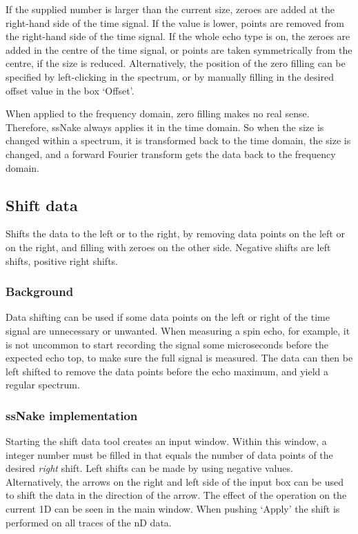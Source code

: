 \documentclass[11pt,a4paper]{article}
\begin{document}
If the supplied number is larger than the current size, zeroes are added at the right-hand side of the time signal. If the value is lower, points are removed from the right-hand side of the time signal. If the whole echo type is on, the zeroes are added in the centre of the time signal, or points are taken symmetrically from the centre, if the size is reduced. Alternatively, the position of the zero filling can be specified by left-clicking in the spectrum, or by manually filling in the desired offset value in the box `Offset'.

When applied to the frequency domain, zero filling makes no real sense. Therefore, ssNake always applies it in the time domain. So when the size is changed within a spectrum, it is transformed back to the time domain, the size is changed, and a forward Fourier transform gets the data back to the frequency domain.

\subsection{Shift data}
Shifts the data to the left or to the right, by removing data points on the left or on the right, and filling with zeroes on the other side. Negative shifts are left shifts, positive right shifts.

\subsubsection*{Background}
Data shifting can be used if some data points on the left or right of the time signal are unnecessary or unwanted. When measuring a spin echo, for example, it is not uncommon to start recording the signal some microseconds before the expected echo top, to make sure the full signal is measured. The data can then be left shifted to remove the data points before the echo maximum, and yield a regular spectrum.

\subsubsection*{ssNake implementation}
Starting the shift data tool creates an input window. Within this window, a integer number must be filled in that equals the number of data points of the  desired \textit{right} shift. Left shifts can be made by using negative values. Alternatively, the arrows on the right and left side of the input box can be used to shift the data in the direction of the arrow. The effect of the operation on the current 1D can be seen in the main window. When pushing `Apply' the shift is performed on all traces of the nD data.
\end{document}
